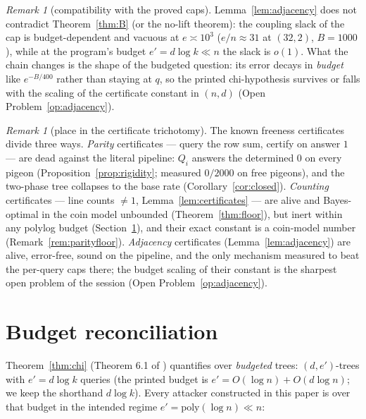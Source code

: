 \documentclass[11pt]{article}
\theoremstyle{definition}
\theoremstyle{remark}
\newtheorem{remark}[theorem]{Remark}
\begin{document}
\begin{remark}[compatibility with the proved caps]\label{rem:chainvsB}
Lemma~\ref{lem:adjacency} does not contradict Theorem~\ref{thm:B} (or
the no-lift theorem): the coupling slack of the cap is
budget-dependent and vacuous at $e\asymp10^3$ ($e/n\approx31$ at
$(32,2)$, $B=1000$), while at the program's budget $e'=d\log k\ll n$
the slack is $o(1)$.  What the chain changes is the shape of the
budgeted question: its error decays in \emph{budget} like
$e^{-B/400}$ rather than staying at $q$, so the printed chi-hypothesis
survives or falls with the scaling of the certificate constant in
$(n,d)$ (Open Problem~\ref{op:adjacency}).
\end{remark}

\begin{remark}[place in the certificate trichotomy]\label{rem:trichotomy}
The known freeness certificates divide three ways.  \emph{Parity}
certificates --- query the row sum, certify on answer $1$ --- are dead
against the literal pipeline: $Q_i$ answers the determined $0$ on
every pigeon (Proposition~\ref{prop:rigidity}; measured $0/2000$ on
free pigeons), and the two-phase tree collapses to the base rate
(Corollary~\ref{cor:closed}).  \emph{Counting} certificates --- line
counts $\neq1$, Lemma~\ref{lem:certificates} --- are alive and
Bayes-optimal in the coin model unbounded (Theorem~\ref{thm:floor}),
but inert within any polylog budget (Section~\ref{sec:budget}), and
their exact constant is a coin-model number
(Remark~\ref{rem:parityfloor}).  \emph{Adjacency} certificates
(Lemma~\ref{lem:adjacency}) are alive, error-free, sound on the
pipeline, and the only mechanism measured to beat the per-query caps
there; the budget scaling of their constant is the sharpest open
problem of the session (Open Problem~\ref{op:adjacency}).
\end{remark}

\section{Budget reconciliation}\label{sec:budget}

Theorem~\ref{thm:chi} (Theorem 6.1 of \cite{Kra26}) quantifies over
\emph{budgeted} trees: $(d,e')$-trees with $e'=d\log k$ queries (the
printed budget is $e'=O(\log n)+O(d\log n)$; we keep the shorthand
$d\log k$).  Every attacker constructed in this paper is over that
budget in the intended regime $e'=\mathrm{poly}(\log n)\ll n$:
\end{document}
